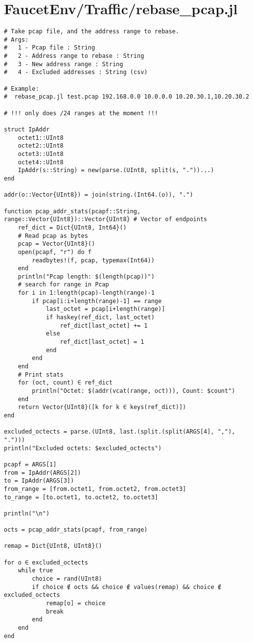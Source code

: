 \section{FaucetEnv/Traffic/rebase\_pcap.jl}
\begin{lstlisting}[language=JuliaLocal, style=julia]
# Take pcap file, and the address range to rebase.
# Args:
#   1 - Pcap file : String
#   2 - Address range to rebase : String
#   3 - New address range : String
#   4 - Excluded addresses : String (csv)

# Example:
#  rebase_pcap.jl test.pcap 192.168.0.0 10.0.0.0 10.20.30.1,10.20.30.2

# !!! only does /24 ranges at the moment !!!

struct IpAddr
    octet1::UInt8
    octet2::UInt8
    octet3::UInt8
    octet4::UInt8
    IpAddr(s::String) = new(parse.(UInt8, split(s, "."))...)
end

addr(o::Vector{UInt8}) = join(string.(Int64.(o)), ".")

function pcap_addr_stats(pcapf::String, range::Vector{UInt8})::Vector{UInt8} # Vector of endpoints
    ref_dict = Dict{UInt8, Int64}()
    # Read pcap as bytes
    pcap = Vector{UInt8}()
    open(pcapf, "r") do f
        readbytes!(f, pcap, typemax(Int64))
    end
    println("Pcap length: $(length(pcap))")
    # search for range in Pcap
    for i in 1:length(pcap)-length(range)-1
        if pcap[i:i+length(range)-1] == range
            last_octet = pcap[i+length(range)]
            if haskey(ref_dict, last_octet)
                ref_dict[last_octet] += 1
            else
                ref_dict[last_octet] = 1
            end
        end
    end
    # Print stats
    for (oct, count) ∈ ref_dict
        println("Octet: $(addr(vcat(range, oct))), Count: $count")
    end
    return Vector{UInt8}([k for k ∈ keys(ref_dict)])
end

excluded_octects = parse.(UInt8, last.(split.(split(ARGS[4], ","), ".")))
println("Excluded octets: $excluded_octects")

pcapf = ARGS[1]
from = IpAddr(ARGS[2])
to = IpAddr(ARGS[3])
from_range = [from.octet1, from.octet2, from.octet3]
to_range = [to.octet1, to.octet2, to.octet3]

println("\n")

octs = pcap_addr_stats(pcapf, from_range)

remap = Dict{UInt8, UInt8}()

for o ∈ excluded_octects
    while true
        choice = rand(UInt8)
        if choice ∉ octs && choice ∉ values(remap) && choice ∉ excluded_octects
            remap[o] = choice
            break
        end
    end
end



\end{lstlisting}
